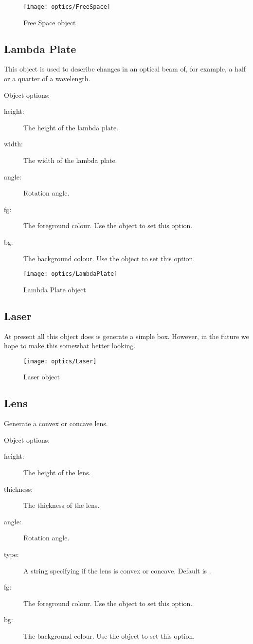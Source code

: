 \begin{figure}[!ht]
\centerline{\texttt{[image: optics/FreeSpace]}}
\caption{Free Space object}
\label{fig:free_space}
\end{figure}

\subsection{Lambda Plate}

This object is used to describe changes in an optical beam of, for example,
a half or a quarter of a wavelength.

Object options:
\begin{description}
\item[height:] The height of the lambda plate.
\item[width:] The width of the lambda plate.
\item[angle:] Rotation angle.
\item[fg:] The foreground colour.  Use the  object to set this
option.
\item[bg:] The background colour.  Use the  object to set this
option.
\end{description}

\begin{figure}[!ht]
\centerline{\texttt{[image: optics/LambdaPlate]}}
\caption{Lambda Plate object}
\label{fig:lambda_plate}
\end{figure}

\subsection{Laser}

At present all this object does is generate a simple box.  However, in the
future we hope to make this somewhat better looking.

\begin{figure}[!ht]
\centerline{\texttt{[image: optics/Laser]}}
\caption{Laser object}
\label{fig:laser}
\end{figure}

\subsection{Lens}

Generate a convex or concave lens.

Object options:
\begin{description}
\item[height:] The height of the lens.
\item[thickness:] The thickness of the lens.
\item[angle:] Rotation angle.
\item[type:] A string specifying if the lens is convex or concave.  Default
is .
\item[fg:] The foreground colour.  Use the  object to set this
option.
\item[bg:] The background colour.  Use the  object to set this
option.
\end{description}

